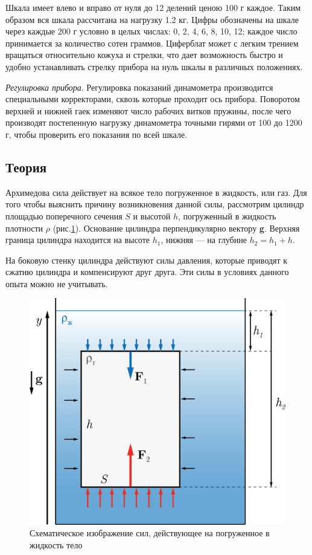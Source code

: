 \documentclass[All.tex]{subfiles}
\begin{document}
Шкала имеет влево и вправо от нуля до 12 делений ценою 100 г каждое.
Таким образом вся шкала рассчитана на нагрузку 1.2 кг.
Цифры обозначены на шкале через каждые 200 г условно в целых числах: 0, 2, 4, 6, 8, 10, 12; каждое число принимается за количество сотен граммов.
Циферблат может с легким трением вращаться относительно кожуха и стрелки, что дает возможность быстро и удобно устанавливать стрелку прибора на нуль шкалы в различных положениях.

\textit{Регулировка прибора}. Регулировка показаний динамометра производится специальными корректорами, сквозь которые проходит ось прибора.
Поворотом верхней и нижней гаек изменяют число рабочих витков пружины, после чего производят постепенную нагрузку динамометра точными гирями от 100 до 1200 г, чтобы проверить его показания по всей шкале.

\subsection*{\textcolor{PineGreen}{Теория}}

Архимедова сила действует на всякое тело погруженное в жидкость, или газ.
Для того чтобы выяснить причину возникновения данной силы, рассмотрим цилиндр площадью поперечного сечения $ S $ и высотой $ h $, погруженный в жидкость плотности $\rho$ (рис.\ref{newton-4}). 
Основание цилиндра перпендикулярно вектору \textbf{g}. 
Верхняя граница цилиндра находится на высоте $ h_{1} $, нижняя — на глубине $ h_{2} = h_{1} + h $.

На боковую стенку цилиндра действуют силы давления, которые приводят к сжатию цилиндра и компенсируют друг друга.
Эти силы в условиях данного опыта можно не учитывать.

\begin{figure}[H] 
	\centering 	
	\includegraphics[width=0.6\linewidth]{newton-4.png}
	\caption{Схематическое изображение сил, действующее на погруженное в жидкость тело}
	\label{newton-4}
\end{figure}
\end{document}
